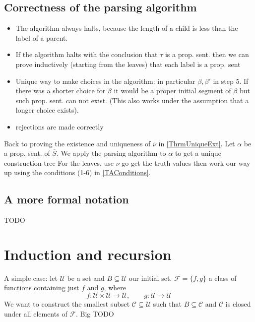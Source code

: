 \subsection*{Correctness of the parsing algorithm}
\begin{itemize}
    \item The algorithm always halts, because the length of a child is less than the label of a parent.
    \item If the algorithm halts with the conclusion that $\tau$ is a prop. sent. 
    then we can prove inductively (starting from the leaves) that each label is a prop. sent
    \item Unique way to make choices in the algorithm: in particular $\beta, \beta'$ in step 5.
    If there was a shorter choice for $\beta$ it would be a proper initial segment of $\beta$ but such prop. sent. can not exist.
    (This also works under the assumption that a longer choice exists).
    \item rejections are made correctly
\end{itemize}
Back to proving the existence and uniqueness of $\overline{\nu}$ in \ref{ThrmUniqueExt}.
Let $\alpha$ be a prop. sent. of $\overline{S}$. We apply the parsing algorithm to $\alpha$ to get a unique construction tree
For the leaves, use $\nu$ go get the truth values then work our way up using the conditions (1-6) in \ref{TAConditions}.
\subsection*{A more formal notation}
TODO
\section{Induction and recursion}
A simple case: let $\mathcal{U}$ be a set and $B\subseteq \mathcal{U}$ our initial set.
$\mathcal{F} = \{f,g\}$ a class of functions containing just $f$ and $g$, where $$f:\mathcal{U}\times \mathcal{U}\to \mathcal{U}, \qquad g: \mathcal{U}\to \mathcal{U}$$
We want to construct the smallest subset $\mathcal{C}\subseteq \mathcal{U}$ such that $B\subseteq \mathcal{C}$ and $\mathcal{C}$ is closed under all elements of $\mathcal{F}$.
Big
TODO
